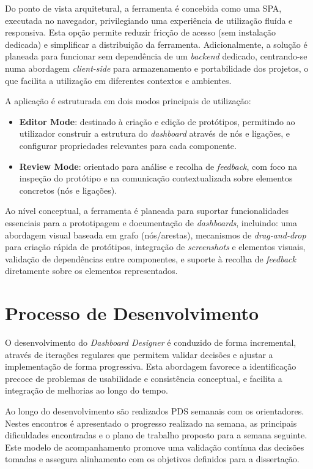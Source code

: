 Do ponto de vista arquitetural, a ferramenta é concebida como uma \gls{SPA}, executada no navegador, privilegiando uma experiência de utilização fluída e responsiva. Esta opção permite reduzir fricção de acesso (sem instalação dedicada) e simplificar a distribuição da ferramenta. Adicionalmente, a solução é planeada para funcionar sem dependência de um \textit{backend} dedicado, centrando-se numa abordagem \textit{client-side} para armazenamento e portabilidade dos projetos, o que facilita a utilização em diferentes contextos e ambientes.

A aplicação é estruturada em dois modos principais de utilização:
\begin{itemize}
  \item \textbf{Editor Mode}: destinado à criação e edição de protótipos, permitindo ao utilizador construir a estrutura do \textit{dashboard} através de nós e ligações, e configurar propriedades relevantes para cada componente.
  \item \textbf{Review Mode}: orientado para análise e recolha de \textit{feedback}, com foco na inspeção do protótipo e na comunicação contextualizada sobre elementos concretos (nós e ligações).
\end{itemize}

Ao nível conceptual, a ferramenta é planeada para suportar funcionalidades essenciais para a prototipagem e documentação de \textit{dashboards}, incluindo: uma abordagem visual baseada em grafo (nós/arestas), mecanismos de \textit{drag-and-drop} para criação rápida de protótipos, integração de \textit{screenshots} e elementos visuais, validação de dependências entre componentes, e suporte à recolha de \textit{feedback} diretamente sobre os elementos representados.

\section{Processo de Desenvolvimento}
\label{sec:cap3_plano_desenvolvimento}

O desenvolvimento do \textit{Dashboard Designer} é conduzido de forma incremental, através de iterações regulares que permitem validar decisões e ajustar a implementação de forma progressiva. Esta abordagem favorece a identificação precoce de problemas de usabilidade e consistência conceptual, e facilita a integração de melhorias ao longo do tempo.

Ao longo do desenvolvimento são realizados \gls{PDS} semanais com os orientadores. Nestes encontros é apresentado o progresso realizado na semana, as principais dificuldades encontradas e o plano de trabalho proposto para a semana seguinte. Este modelo de acompanhamento promove uma validação contínua das decisões tomadas e assegura alinhamento com os objetivos definidos para a dissertação.

